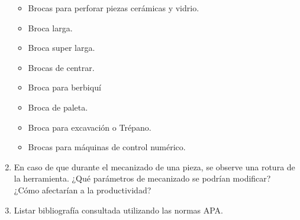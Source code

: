 \documentclass[a4paper]{article}
\begin{document}
\begin{enumerate}
\begin{itemize}
      \item Brocas para perforar piezas cerámicas y vidrio.
      \item Broca larga.
      \item Broca super larga.
      \item Brocas de centrar.
      \item Broca para berbiquí
      \item Broca de paleta.
      \item Broca para excavación o Trépano.
      \item Brocas para máquinas de control numérico.
    \end{itemize} 
    \item En caso de que durante el mecanizado de una pieza, se observe una rotura de la herramienta.
    ¿Qué parámetros de mecanizado se podrían modificar? ¿Cómo afectarían a la productividad?
     \item Listar bibliografía consultada utilizando las normas APA.
  \end{enumerate}
\end{document}
